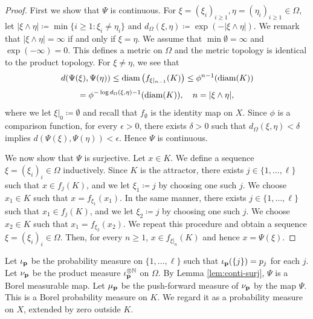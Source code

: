 \documentclass[a4paper, reqno, 11pt]{amsart}
\theoremstyle{definition}
\begin{document}
\begin{proof}
First we show that $\Psi$ is continuous. 
For $\xi = (\xi_i)_{i \ge 1}, \eta = (\eta_i)_{i \ge 1} \in \Omega$, 
let $|\xi \wedge \eta| \coloneqq \min\{i \ge 1 \colon \xi_i \ne \eta_i\}$ and $d_{\Omega} (\xi, \eta) \coloneqq \exp(-|\xi \wedge \eta|)$. 
We remark that $|\xi \wedge \eta| = \infty$ if and only if $\xi = \eta$. 
We assume that $\min \emptyset = \infty$ and $\exp(-\infty) = 0$. 
This defines a metric on $\Omega$ and the metric topology is identical to the product topology. 
For $\xi \ne \eta$, we see that 
\[ d(\Psi(\xi), \Psi(\eta)) \le \textup{diam}\left(f_{\xi|_{n-1}} (K) \right) \le \phi^{n -1}(\textup{diam}(K)) \]
\[ = \phi^{-\log d_{\Omega}(\xi, \eta) -1}(\textup{diam}(K)), \quad n = |\xi \wedge \eta|,  \]
where we let $\xi|_0 \coloneqq \emptyset$ and recall that $f_{\emptyset}$ is the identity map on $X$. 
Since $\phi$ is a comparison function, 
for every $\epsilon > 0$, there exists $\delta > 0$ such that $d_{\Omega}(\xi, \eta) < \delta$ implies $d(\Psi(\xi), \Psi(\eta)) < \epsilon$. 
Hence $\Psi$ is continuous. 

We now show that $\Psi$ is surjective. 
Let $x \in K$. 
We define a sequence $\xi = (\xi_i)_i \in \Omega$ inductively. 
Since $K$ is the attractor, there exists $j  \in \{1, \dots, \ell\}$ such that $x \in f_{j} (K)$, and we let $\xi_1 \coloneqq j$ by choosing one such $j$. 
We choose $x_1 \in K$ such that $x = f_{\xi_1} (x_1)$. 
In the same manner, there exists $j \in \{1, \dots, \ell\}$ such that $x_1 \in f_{j} (K)$, and we let $\xi_2 \coloneqq j$ by choosing one such $j$. 
We choose $x_2 \in K$ such that $x_1 = f_{\xi_2} (x_2)$. 
We repeat this procedure and obtain a sequence $\xi = (\xi_i)_i \in \Omega$. 
 Then, for every $n \ge 1$, $x \in f_{\xi|_{n}} (K)$ and hence $x = \Psi(\xi)$. 
\end{proof}

Let $\iota_{\bf p}$ be the probability measure on $\{1,\dots, \ell\}$ such that $\iota_{\bf p} (\{j\}) = p_j$ for each $j$. 
Let $\nu_{\bf p}$ be the product measure $\iota_{\bf p}^{\otimes \mathbb N}$ on $\Omega$. 
By Lemma \ref{lem:conti-surj}, $\Psi$ is a Borel measurable map. 
Let $\mu_{\bf p}$ be the push-forward measure of $\nu_{\bf p}$ by the map $\Psi$.  
This is a Borel probability measure on $K$. 
We regard it as a probability measure on $X$, extended by zero outside $K$. 
\end{document}
